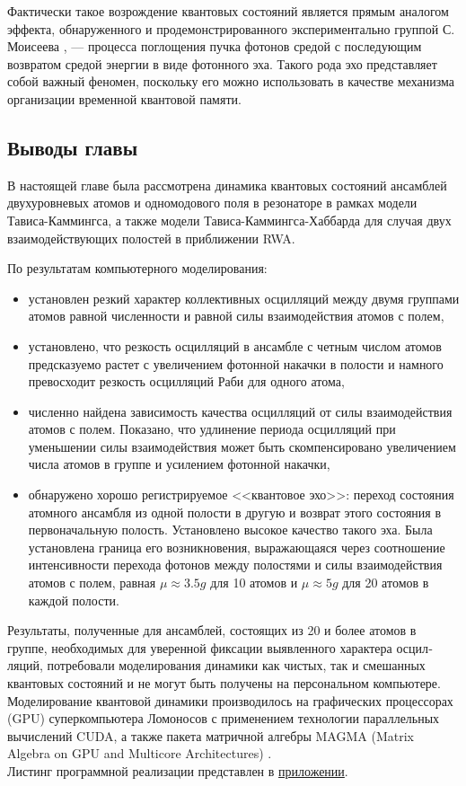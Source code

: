 Фактически такое возрождение квантовых состояний является прямым аналогом эффекта, обнаруженного и продемонстрированного экспериментально группой С. Моисеева \cite{moiseev_1,moiseev_2,moiseev_3,moiseev_4}, --- процесса поглощения пучка фотонов средой с последующим возвратом средой энергии в виде фотонного эха. Такого рода эхо представляет собой важный феномен, поскольку его можно использовать в качестве механизма организации временной квантовой памяти.

\clearpage
\subsection{Выводы главы}
В настоящей главе была рассмотрена динамика квантовых состояний ансамблей двухуровневых атомов и одномодового поля в резонаторе в рамках модели Тависа-Каммингса, а также модели Тависа-Каммингса-Хаббарда для случая двух взаимодействующих полостей в приближении RWA.

По результатам компьютерного моделирования:
\begin{itemize}
	\item{установлен резкий характер коллективных осцилляций между двумя группами атомов равной численности и равной силы взаимодействия атомов с полем,}
	\item{установлено, что резкость осцилляций в ансамбле с четным числом атомов предсказуемо растет с увеличением фотонной накачки в полости и намного превосходит резкость осцилляций Раби для одного атома},
	\item{численно найдена зависимость качества осцилляций от силы взаимодействия атомов с полем. Показано, что удлинение периода осцилляций при уменьшении силы взаимодействия может быть скомпенсировано увеличением числа атомов в группе и усилением фотонной накачки,}
	\item{обнаружено хорошо регистрируемое <<квантовое эхо>>: переход состояния атомного ансамбля из одной полости в другую и возврат этого
состояния в первоначальную полость. Установлено высокое качество такого эха. Была установлена граница его возникновения, выражающаяся через соотношение интенсивности перехода фотонов между полостями и силы взаимодействия атомов с полем, равная $\mu \approx 3.5g$ для 10 атомов и $\mu \approx 5g$ для 20 атомов в каждой полости.}
\end{itemize}

\indent Результаты, полученные для ансамблей, состоящих из 20 и более атомов в группе, необходимых для уверенной фиксации выявленного характера осцил­ляций, потребовали моделирования динамики как чистых, так и смешанных квантовых состояний и не могут быть получены на персональном компью­тере. Моделирование квантовой динамики производилось на графических процессорах (GPU) суперкомпьютера Ломоносов с применением технологии па­раллельных вычислений CUDA, а также пакета матричной алгебры MAGMA (Matrix Algebra on GPU and Multicore Architectures) \cite{magma}.
\\[12pt]
\noindent Листинг программной реализации представлен в \hyperref[appendix]{приложении}.

\nocite{dat_plenio}
\nocite{ambainis}
\nocite{vynberg}
\nocite{pkok}
\nocite{jaynes_cummings_comparison}
\nocite{vibrations_quanta_biology}
